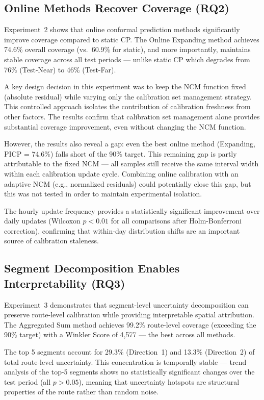 \subsection{Online Methods Recover Coverage (RQ2)}

Experiment~2 shows that online conformal prediction methods significantly improve coverage compared to static CP. The Online Expanding method achieves 74.6\% overall coverage (vs.\ 60.9\% for static), and more importantly, maintains stable coverage across all test periods — unlike static CP which degrades from 76\% (Test-Near) to 46\% (Test-Far).

A key design decision in this experiment was to keep the NCM function fixed (absolute residual) while varying only the calibration set management strategy. This controlled approach isolates the contribution of calibration freshness from other factors. The results confirm that calibration set management alone provides substantial coverage improvement, even without changing the NCM function.

However, the results also reveal a gap: even the best online method (Expanding, PICP = 74.6\%) falls short of the 90\% target. This remaining gap is partly attributable to the fixed NCM — all samples still receive the same interval width within each calibration update cycle. Combining online calibration with an adaptive NCM (e.g., normalized residuals) could potentially close this gap, but this was not tested in order to maintain experimental isolation.

The hourly update frequency provides a statistically significant improvement over daily updates (Wilcoxon $p < 0.01$ for all comparisons after Holm-Bonferroni correction), confirming that within-day distribution shifts are an important source of calibration staleness.

\subsection{Segment Decomposition Enables Interpretability (RQ3)}

Experiment~3 demonstrates that segment-level uncertainty decomposition can preserve route-level calibration while providing interpretable spatial attribution. The Aggregated Sum method achieves 99.2\% route-level coverage (exceeding the 90\% target) with a Winkler Score of 4,577 — the best across all methods.

The top 5 segments account for 29.3\% (Direction~1) and 13.3\% (Direction~2) of total route-level uncertainty. This concentration is temporally stable — trend analysis of the top-5 segments shows no statistically significant changes over the test period (all $p > 0.05$), meaning that uncertainty hotspots are structural properties of the route rather than random noise.

